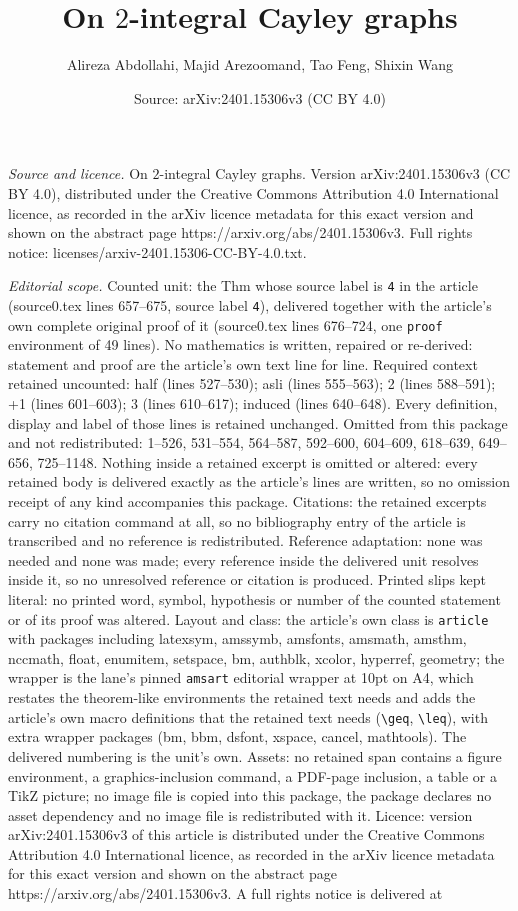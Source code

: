 \documentclass[10pt,a4paper]{amsart}
\title[On $2$-integral Cayley graphs]{On $2$-integral Cayley graphs}
\author{Alireza Abdollahi, Majid Arezoomand, Tao Feng, Shixin Wang}
\date{Source: arXiv:2401.15306v3 (CC BY 4.0)}
\begin{document}
\maketitle

\noindent\emph{Source and licence.} On $2$-integral Cayley graphs. Version arXiv:2401.15306v3 (CC BY 4.0), distributed under the Creative Commons Attribution 4.0 International licence, as recorded in the arXiv licence metadata for this exact version and shown on the abstract page https://arxiv.org/abs/2401.15306v3. Full rights notice: licenses/arxiv-2401.15306-CC-BY-4.0.txt.\par\smallskip

\noindent\textit{Editorial scope.} Counted unit: the Thm whose source label is \texttt{4} in the article (source0.tex lines 657--675, source label \texttt{4}), delivered together with the article's own complete original proof of it (source0.tex lines 676--724, one \texttt{proof} environment of 49 lines). No mathematics is written, repaired or re-derived: statement and proof are the article's own text line for line. Required context retained uncounted: half (lines 527--530); asli (lines 555--563); 2 (lines 588--591); +1 (lines 601--603); 3 (lines 610--617); induced (lines 640--648). Every definition, display and label of those lines is retained unchanged. Omitted from this package and not redistributed: 1--526, 531--554, 564--587, 592--600, 604--609, 618--639, 649--656, 725--1148. Nothing inside a retained excerpt is omitted or altered: every retained body is delivered exactly as the article's lines are written, so no omission receipt of any kind accompanies this package. Citations: the retained excerpts carry no citation command at all, so no bibliography entry of the article is transcribed and no reference is redistributed. Reference adaptation: none was needed and none was made; every reference inside the delivered unit resolves inside it, so no unresolved reference or citation is produced. Printed slips kept literal: no printed word, symbol, hypothesis or number of the counted statement or of its proof was altered. Layout and class: the article's own class is \texttt{article} with packages including latexsym, amssymb, amsfonts, amsmath, amsthm, nccmath, float, enumitem, setspace, bm, authblk, xcolor, hyperref, geometry; the wrapper is the lane's pinned \texttt{amsart} editorial wrapper at 10pt on A4, which restates the theorem-like environments the retained text needs and adds the article's own macro definitions that the retained text needs (\texttt{\textbackslash geq}, \texttt{\textbackslash leq}), with extra wrapper packages (bm, bbm, dsfont, xspace, cancel, mathtools). The delivered numbering is the unit's own. Assets: no retained span contains a figure environment, a graphics-inclusion command, a PDF-page inclusion, a table or a TikZ picture; no image file is copied into this package, the package declares no asset dependency and no image file is redistributed with it. Licence: version arXiv:2401.15306v3 of this article is distributed under the Creative Commons Attribution 4.0 International licence, as recorded in the arXiv licence metadata for this exact version and shown on the abstract page https://arxiv.org/abs/2401.15306v3. A full rights notice is delivered at 
\end{document}
